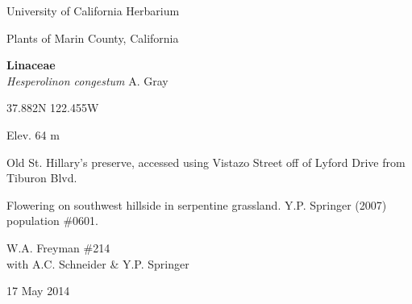 \documentclass[letterpaper,10pt]{article}
\begin{document}

%
%

\begin{minipage}[t]{0.40\textwidth}

\begin{center}
University of California Herbarium \\
\begin{large}
Plants of Marin County, California \\
\end{large}
\vspace{\baselineskip}
\textbf{Linaceae} \\
\textit{Hesperolinon congestum} A. Gray\\
\end{center}

\begin{footnotesize}

\begin{multicols}{2}
37.882\textdegree N 122.455\textdegree W
\columnbreak
\begin{flushright}
Elev. 64 m
\end{flushright}
\end{multicols}

Old St. Hillary's preserve, accessed using Vistazo Street off of Lyford Drive from Tiburon Blvd.
\vspace{\baselineskip}

Flowering on southwest hillside in serpentine grassland. Y.P. Springer (2007) population \#0601.

\begin{multicols}{2}
W.A. Freyman \#214 \\
with A.C. Schneider \& Y.P. Springer
\columnbreak
\begin{flushright}
17 May 2014
\end{flushright}
\end{multicols}

\end{footnotesize}

\end{minipage}
%
\hspace{2cm}
%
\end{document}

